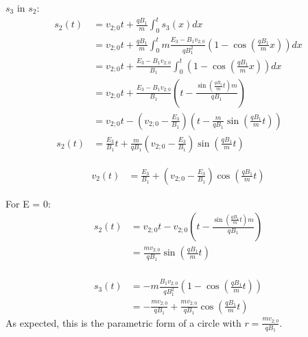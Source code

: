 \documentclass[english, a4paper, 10pt]{article}
\begin{document}
$s_3$ in $s_2$:
\begin{equation}
\begin{split}
s_2(t)  &= v_{2;0} t + \frac{q B_1}{m} \int_0^t s_3(x) dx	\\\
		&= v_{2;0} t + \frac{q B_1}{m} \int_0^t m \frac{E_3 - B_1 v_{2;0}}{q B_1^2} \left( 1 - \cos\left(\frac{q B_1}{m} x\right)\right) dx	\\\
		&= v_{2;0} t + \frac{E_3 - B_1 v_{2;0}}{B_1} \int_0^t \left( 1 - \cos\left(\frac{q B_1}{m} x\right)\right) dx	\\\
		&= v_{2;0} t + \frac{E_3 - B_1 v_{2;0}}{B_1} \left(t - \frac{\sin\left(\frac{q B_1}{m} t\right) m}{q B_1}\right) \\\
%
		&= v_{2;0} t - \left(v_{2;0} - \frac{E_3}{B_1}\right) \left(t - \frac{m}{q B_1} \sin\left(\frac{q B_1}{m} t\right) \right) \\\
%
s_2(t)	&= \frac{E_3}{B_1} t + \frac{m}{q B_1} \left(v_{2;0} - \frac{E_3}{B_1}\right) \sin\left(\frac{q B_1}{m} t\right)
\end{split}
\end{equation}

\begin{equation}
\begin{split}
v_2(t) &= \frac{E_3}{B_1} + \left(v_{2;0} - \frac{E_3}{B_1}\right) \cos\left(\frac{q B_1}{m} t\right)
\end{split}
\end{equation}

For E = 0:
\begin{equation}
\begin{split}
s_2(t) 	&= v_{2;0} t - v_{2;0} \left(t - \frac{\sin\left(\frac{q B_1}{m} t\right) m}{q B_1}\right) \\\
		&= \frac{m v_{2;0}}{q B_1} \sin\left(\frac{q B_1}{m} t\right) \\\
\end{split}
\end{equation}

\begin{equation}
\begin{split}
s_3(t) 	&= -m \frac{B_1 v_{2;0}}{q B_1^2} \left( 1 - \cos\left(\frac{q B_1}{m} t\right)\right) \\\
		&= -\frac{m v_{2;0}}{q B_1} + \frac{m v_{2;0}}{q B_1} \cos\left(\frac{q B_1}{m} t\right)
\end{split}
\end{equation}
As expected, this is the parametric form of a circle with $r = \frac{m v_{2;0}}{q B_1}$.
\end{document}
